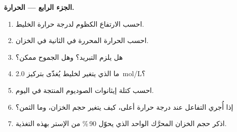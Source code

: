 \begin{problem}
\medskip
\noindent\textbf{الجزء الرابع --- الحرارة.}
\begin{enumerate}[resume]
  \item احسب الارتفاع الكظوم لدرجة حرارة الخليط.
  \item احسب الحرارة المحررة في الثانية في الخزان.
  \item هل يلزم التبريد؟ وهل الجموح ممكن؟
  \item ما الذي يتغير لخليط يُغذّى بتركيز \qty{2.0}{mol/L}؟
  \item احسب كتلة إيثانوات الصوديوم المنتجة في اليوم.
  \item إذا أُجري التفاعل عند درجة حرارة أعلى، كيف يتغير حجم الخزان،
        وما الثمن؟
  \item اذكر حجم الخزان المحرَّك الواحد الذي يحوّل 90\,\% من
        الإستر بهذه التغذية.
\end{enumerate}
\end{problem}
